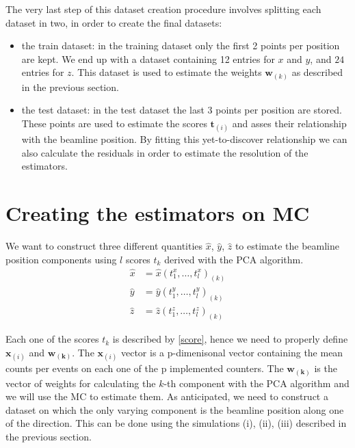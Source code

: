 The very last step of this dataset creation procedure involves splitting each dataset in two, in order to create the final datasets: 
\begin{itemize}
    \item the train dataset: in the training dataset only the first 2 points per position are kept. We end up with a dataset containing 12 entries for $x$ and $y$, and $24$ entries for $z$. This dataset is used to estimate the weights $\mathbf{w}_{(k)}$ as described in the previous section.
    \item the test dataset: in the test dataset the last 3 points per position are stored. These points are used to estimate the scores $\mathbf{t}_{(i)}$ and asses their relationship with the beamline position. By fitting this yet-to-discover relationship we can also calculate the residuals in order to estimate the resolution of the estimators.
\end{itemize}


\section{Creating the estimators on MC}

We want to construct three different quantities $\hat{x}$, $\hat{y}$, $\hat{z}$ to estimate the beamline position components using $l$ scores $t_k$ derived with the PCA algorithm.
\begin{align}
    \hat{x} &= \hat{x}(t^x_1, \dots, t^x_l)_{(k)} \\
    \hat{y} &= \hat{y}(t^y_1, \dots, t^y_l)_{(k)} \\
    \hat{z} &= \hat{z}(t^z_1, \dots, t^z_l)_{(k)} 
\end{align} 

Each one of the scores $t_k$ is described by \eqref{score}, hence we need to properly define $\mathbf{x}_{(i)}$ and $\mathbf{w_{(k)}}$. The $\mathbf{x}_{(i)}$ vector is a p-dimenisonal vector containing the mean counts per events on each one of the p implemented counters. The  $\mathbf{w_{(k)}}$ is the vector of weights for calculating the $k$-th component with the PCA algorithm and we will use the MC to estimate them. 
As anticipated, we need to construct a dataset on which the only varying component is the beamline position along one of the direction. This can be done using the simulations (i), (ii), (iii) described in the previous section. 


